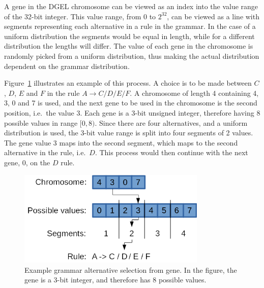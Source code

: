 A gene in the \gls{DGEL} chromosome can be viewed as an index into the value range of the 32-bit integer.
This value range, from $0$ to $2^{32}$, can be viewed as a line with segments representing each alternative in a rule in the grammar.
In the case of a uniform distribution the segments would be equal in length, while for a different distribution the lengths will differ.
The value of each gene in the chromosome is randomly picked from a uniform distribution, thus making the actual distribution dependent on the grammar distribution.

Figure~\ref{fig:gene} illustrates an example of this process.
A choice is to be made between $C$, $D$, $E$ and $F$ in the rule $A \rightarrow C / D / E / F$.
A chromosome of length 4 containing 4, 3, 0 and 7 is used, and the next gene to be used in the chromosome is the second position, i.e.\ the value 3.
Each gene is a 3-bit unsigned integer, therefore having 8 possible values in range $[0, 8)$.
Since there are four alternatives, and a uniform distribution is used, the 3-bit value range is split into four segments of 2 values.
The gene value 3 maps into the second segment, which maps to the second alternative in the rule, i.e.\ $D$.
This process would then continue with the next gene, 0, on the $D$ rule.


\begin{figure}
    \centering
    \includegraphics[width=0.8\textwidth]{figures/gene}
    \caption[Example grammar alternative selection from gene]{Example grammar alternative selection from gene. In the figure, the gene is a 3-bit integer, and therefore has 8 possible values.}
    \label{fig:gene}
\end{figure}

